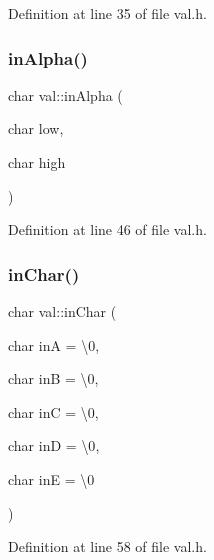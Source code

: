 Definition at line 35 of file val.\+h.

\mbox{\label{namespaceval_a9d9b8061acd12340109a2c0f9ff8cbde}} 
\subsubsection{\texorpdfstring{in\+Alpha()}{inAlpha()}\hspace{0.1cm}{\footnotesize\ttfamily [2/2]}}
{\footnotesize\ttfamily char val\+::in\+Alpha (\begin{DoxyParamCaption}\item[{char}]{low,  }\item[{char}]{high }\end{DoxyParamCaption})}



Definition at line 46 of file val.\+h.

\mbox{\label{namespaceval_a42fc673916a9deeccf41604909858a8d}} 
\subsubsection{\texorpdfstring{in\+Char()}{inChar()}}
{\footnotesize\ttfamily char val\+::in\+Char (\begin{DoxyParamCaption}\item[{char}]{inA = {\ttfamily \textquotesingle{}\textbackslash{}0\textquotesingle{}},  }\item[{char}]{inB = {\ttfamily \textquotesingle{}\textbackslash{}0\textquotesingle{}},  }\item[{char}]{inC = {\ttfamily \textquotesingle{}\textbackslash{}0\textquotesingle{}},  }\item[{char}]{inD = {\ttfamily \textquotesingle{}\textbackslash{}0\textquotesingle{}},  }\item[{char}]{inE = {\ttfamily \textquotesingle{}\textbackslash{}0\textquotesingle{}} }\end{DoxyParamCaption})}



Definition at line 58 of file val.\+h.

\mbox{\label{namespaceval_a258bd30a8b60ae8e2c0105e1abdc9403}} 
